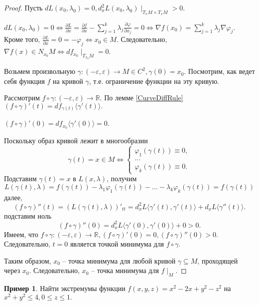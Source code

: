 \documentclass[a5paper]{article}
\newcounter{through}
\theoremstyle{plain}
\theoremstyle{definition}
\newtheorem{example}[through]{Пример}
\numberwithin{through}{section}
\numberwithin{equation}{section}
\begin{document}
\begin{proof}
	Пусть $dL(x_0,\lambda_0) = 0, d_x^2 L(x_0, \lambda_0)\mid_{T_{x}M\times T_{x}M} > 0$. 
	
	$ dL(x_0,\lambda_0) = 0 \iff \frac{\partial L}{\partial x} = 
	\frac{\partial f}{\partial x} - \sum_{j = 1}^{k} \lambda_j\frac{\partial \varphi}{\partial x_j} = 0
	\iff \nabla f(x_0) = \sum_{j = 1}^{k} \lambda_j\nabla\varphi_j.$ 
	Кроме того, $\frac{\partial L}{\partial x} = 0 = - \varphi_j \iff x_0 \in M$.
	Следовательно,  
	$\nabla f(x) \in N_{x_0}M \iff df_{x_0} \mid_{T_{x_0}M} = 0$.
	
	Возьмем произвольную $\gamma:(-\varepsilon, \varepsilon) \to M \in C^2, \gamma(0) = x_0$. 
	Посмотрим, как ведет себя функция $f$ на кривой $\gamma$, т.е. ограничение функции на эту кривую.
	
	Рассмотрим $f \circ \gamma : (-\varepsilon, \varepsilon) \to \mathbb{R}$. 
	По лемме \ref{CurveDiffRule} $(f\circ\gamma)'(t) = df_{\gamma(t)}\langle \gamma'(t)\rangle.$
	
	$(f \circ \gamma)'(0) = df_{x_0}\langle \gamma'(0)\rangle = 0$. 
	
	Поскольку образ кривой лежит в многообразии
	\begin{equation*}
	\gamma(t) = x \in M \iff
		\begin{cases}
		\varphi_1(\gamma(t)) \equiv 0, \\
		\ldots \\
		\varphi_k(\gamma(t)) \equiv 0.
		\end{cases}
	\end{equation*} 
	Подставим $\gamma(t) = x$ в $L(x, \lambda)$, получим
	\[ L(\gamma(t), \lambda) = f(\gamma(t)) - \lambda_1\varphi_1(\gamma(t)) - \ldots -
	\lambda_k\varphi_k(\gamma(t)) = f(\gamma(t)) \]
	далее,
	\[ (f \circ \gamma)''(t) = (L(\gamma(t), \lambda))'_{tt} =
	d_x^2 L\langle \gamma'(t), \gamma'(t) \rangle + d_x L\langle \gamma''(t) \rangle. \]
	подставим ноль
	\[ (f \circ \gamma)''(0) = d_x^2 L\langle \gamma'(0), \gamma'(0) \rangle + 0 > 0. \]
	Имеем, что $f \circ \gamma: (-\varepsilon, \varepsilon) \to \mathbb{R},
	 (f \circ \gamma)'(0) = 0, (f \circ \gamma)''(0) > 0$. 
	 Следовательно, $t = 0$ является точкой минимума для $f \circ \gamma$.
	 
	 Таким образом, $x_0$ -- точка минимума для любой кривой $\gamma \subseteq M$,
	 проходящей через $x_0$. Следовательно, $x_0$ -- точка минимума для $f\mid_{M}.$
\end{proof}

\begin{example}
	Найти экстремумы функции
	$f(x, y, z) = x^2 - 2x + y^2 - z^2$ на $x^2 + y^2 \leq 4, 0 \leq z \leq 1.$
\end{example}
\end{document}
